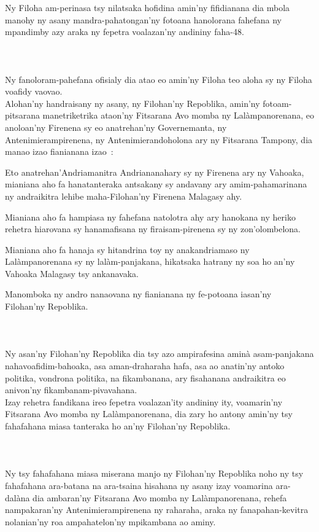 \documentclass[12pt]{article}
\newcounter{laharana}
\newcommand{\andininy}[0]{
  \paragraph{%
    \NoCaseChange{%
      Andininy~\addtocounter{laharana}{1}\thelaharana.}\label{and:\thelaharana}~%
  }%
}
\begin{document}
\noindent
Ny Filoha am-perinasa tsy nilatsaka hofidina amin'ny fifidianana dia mbola
manohy ny asany mandra-pahatongan'ny fotoana hanolorana fahefana ny mpandimby
azy araka ny fepetra voalazan'ny andininy faha-48.

\andininy{}Ny fanoloram-pahefana ofisialy dia atao eo amin'ny Filoha teo aloha
sy ny Filoha voafidy vaovao.\\

\noindent
Alohan'ny handraisany ny asany, ny Filohan'ny Repoblika, amin'ny
fotoam-pitsarana manetriketrika ataon'ny Fitsarana Avo momba ny Lalàmpanorenana,
eo anoloan'ny Firenena sy eo anatrehan'ny Governemanta, ny Antenimierampirenena,
ny Antenimierandoholona ary ny Fitsarana Tampony, dia manao izao fianianana
izao~:
\begin{quoting}[begintext=«~, font=itshape, endtext=~»]
  Eto anatrehan'Andriamanitra Andriananahary sy ny Firenena ary ny Vahoaka,
  mianiana aho fa hanatanteraka antsakany sy andavany ary amim-pahamarinana ny
  andraikitra lehibe maha-Filohan'ny Firenena Malagasy ahy.

  Mianiana aho fa hampiasa ny fahefana natolotra ahy ary hanokana ny heriko
  rehetra hiarovana sy hanamafisana ny firaisam-pirenena sy ny zon'olombelona.

  Mianiana aho fa hanaja sy hitandrina toy ny anakandriamaso ny Lalàmpanorenana
  sy ny lalàm-panjakana, hikatsaka hatrany ny soa ho an'ny Vahoaka Malagasy tsy
  ankanavaka.
\end{quoting}
\noindent
Manomboka ny andro nanaovana ny fianianana ny fe-potoana iasan'ny Filohan'ny
Repoblika.

\andininy{}Ny asan'ny Filohan'ny Repoblika dia tsy azo ampirafesina aminà
asam-panjakana nahavoafidim-bahoaka, asa aman-draharaha hafa, asa ao anatin'ny
antoko politika, vondrona politika, na fikambanana, ary fisahanana andraikitra
eo anivon'ny fikambanam-pivavahana.\\

\noindent
Izay rehetra fandikana ireo fepetra voalazan'ity andininy ity, voamarin'ny
Fitsarana Avo momba ny Lalàmpanorenana, dia zary ho antony amin'ny tsy
fahafahana miasa tanteraka ho an'ny Filohan'ny Repoblika.

\andininy{}Ny tsy fahafahana miasa miserana manjo ny Filohan'ny Repoblika noho
ny tsy fahafahana ara-batana na ara-tsaina hisahana ny asany izay voamarina
ara-dalàna dia ambaran'ny Fitsarana Avo momba ny Lalàmpanorenana, rehefa
nampakaran'ny Antenimierampirenena ny raharaha, araka ny fanapahan-kevitra
nolanian'ny roa ampahatelon'ny mpikambana ao aminy.\\
\end{document}
